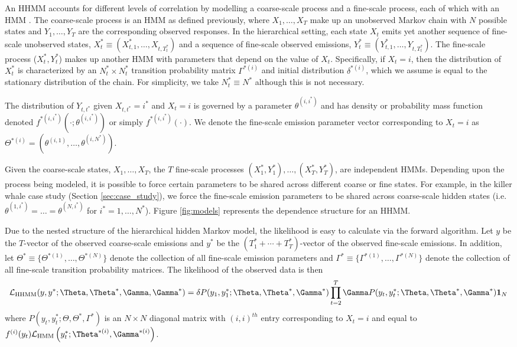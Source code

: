 An HHMM accounts for different levels of correlation by modelling a coarse-scale process and a fine-scale process, each of which with an HMM \citep{Barajas:2017,Adam:2019}. The coarse-scale process is an HMM as defined previously, where $X_1, \ldots, X_T$ make up an unobserved Markov chain with $N$ possible states and $Y_1,\ldots, Y_T$ are the corresponding observed responses.   
%
In the hierarchical setting, each state $X_t$ emits yet another sequence of fine-scale unobserved states, $X_t^* \equiv (X_{t,1}^*,\ldots, X_{t,T_t^*})$ and a sequence of fine-scale observed emissions, $Y_t^* \equiv (Y_{t,1}^*,\ldots, Y_{t,T_t^*})$. The fine-scale process ($X_t^*, Y_t^*$) makes up another HMM with parameters that depend on the value of $X_t$. Specifically, if $X_t=i$, then the distribution of $X_t^*$ is characterized by an $N^*_t \times N^*_t$ transition probability matrix $\Gamma^{*(i)}$ and initial distribution $\delta^{*(i)}$, which we assume is equal to the stationary distribution of the chain. For simplicity, we take $N_t^* \equiv N^*$ although this is not necessary.

The distribution of $Y_{t, t^*}$ given $X_{t, t^*}=i^*$ and $X_t=i$ is governed by a parameter $\theta^{(i,i^*)}$ and has density or probability mass function denoted $f^{*(i,i^*)}\left(\cdot; \theta^{(i,i^*)}\right)$ or simply $f^{*(i,i^*)}(\cdot)$. We denote the fine-scale emission parameter vector corresponding to $X_t=i$ as $\Theta^{*(i)}=\left(\theta^{(i,1)}, \ldots, \theta^{(i,N^*)}\right)$.

Given the coarse-scale states, $X_1,\ldots, X_T$, the $T$ fine-scale processes $(X_1^*, Y_1^*), \ldots, (X_T^*, Y_T^*)$, are independent HMMs. Depending upon the process being modeled, it is possible to force certain parameters to be shared across different coarse or fine states. For example, in the killer whale case study (Section \ref{sec:case_study}), we force the fine-scale emission parameters to be shared across coarse-scale hidden states (i.e. $\theta^{(1,i^*)} = \ldots = \theta^{(N,i^*)}$ for $i^* = 1, \ldots, N^*$). Figure \ref{fig:models} represents the dependence structure for an HHMM.

Due to the nested structure of the hierarchical hidden Markov model, the likelihood is easy to calculate via the forward algorithm.
%
Let $y$ be the $T$-vector of the observed coarse-scale emissions and
$y^*$ be the $(T_1^* + \cdots + T_T^*)$-vector of the observed fine-scale emissions.
%
In addition, let $\Theta^* \equiv \{\Theta^{*(1)}, \ldots, \Theta^{*(N)}\}$ denote the collection of all fine-scale emission parameters and $\Gamma^* \equiv \{\Gamma^{*(1)}, \ldots, \Gamma^{*(N)}\}$ denote the collection of all fine-scale transition probability matrices. The likelihood of the observed data is then
%
\[
\calL_{\text{HHMM}}(y,y^*;\Theta,\Theta^*,\Gamma,\Gamma^*) = \delta P(y_1,y_1^*;\Theta,\Theta^*,\Gamma^*) \prod_{t=2}^T \Gamma P(y_t,y_t^*;\Theta,\Theta^*,\Gamma^*) \mathbf{1}_N
\]
%
where $P(y_t,y_t^*;\Theta,\Theta^*,\Gamma^*)$ is an $N \times N$ diagonal matrix with $(i,i)^{th}$ entry corresponding to $X_t=i$ and equal to 
$f^{(i)}(y_t)\calL_{\text{HMM}}\left(y_t^*;\Theta^{*(i)},
\Gamma^{*(i)}\right)$. 

